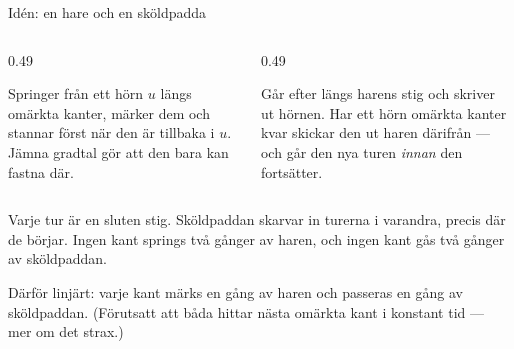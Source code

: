 \begin{frame}{Idén: en hare och en sköldpadda}
\begin{columns}[T]
\begin{column}{0.49\textwidth}
\begin{infobox}[title={\textbf{Haren} (Viggos \textsc{PathFinder})},coltitle=white,colbacktitle=kthorange,
  colframe=kthorange,fonttitle=\small,toptitle=1pt,bottomtitle=1pt]
Springer från ett hörn $u$ längs omärkta kanter, märker dem och stannar först när den är
tillbaka i $u$. Jämna gradtal gör att den bara kan fastna där.
\end{infobox}
\end{column}
\begin{column}{0.49\textwidth}
\begin{infobox}[title={\textbf{Sköldpaddan} (Viggos \textsc{Straggler})},coltitle=white,colbacktitle=kthgreen,
  colframe=kthgreen,fonttitle=\small,toptitle=1pt,bottomtitle=1pt]
Går efter längs harens stig och skriver ut hörnen. Har ett hörn omärkta kanter kvar skickar
den ut haren därifrån — och går den nya turen \emph{innan} den fortsätter.
\end{infobox}
\end{column}
\end{columns}
\medskip
\small
Varje tur är en sluten stig. Sköldpaddan skarvar in turerna i varandra, precis där de börjar.
Ingen kant springs två gånger av haren, och ingen kant gås två gånger av sköldpaddan.
\medskip
\begin{ahabox}
Därför linjärt: varje kant märks en gång av haren och passeras en gång av sköldpaddan.
(Förutsatt att båda hittar nästa omärkta kant i konstant tid — mer om det strax.)
\end{ahabox}
\end{frame}

